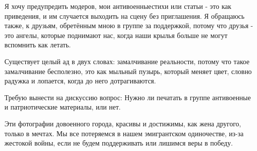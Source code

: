 Я хочу предупредить модеров, мои антивоенныестихи или статьи - это как
приведения, и им случается выходить на сцену без приглашения. Я обращаюсь
также, к друзьям, обретённым мною в группе за поддержкой, потому что друзья -
это ангелы, которые поднимают нас, когда наши крылья больше не могут вспомнить
как летать.

Существует целый ад в двух словах: замалчивание реальности, потому что такое
замалчивание бесполезно, это как мыльный пузырь, который меняет цвет, словно
радужка и лопается, когда до него дотрагиваются.

Требую вынести на дискуссию вопрос: Нужно ли печатать в группе антивоенные и
патриотические материалы, или нет.

Эти фотографии довоенного города, красивы и достижимы, как жена другого, только
в мечтах. Мы все потеряемся в нашем эмигрантском одиночестве, из-за жестокой
войны, если не будем поддерживать или лишимся веры в победу.
